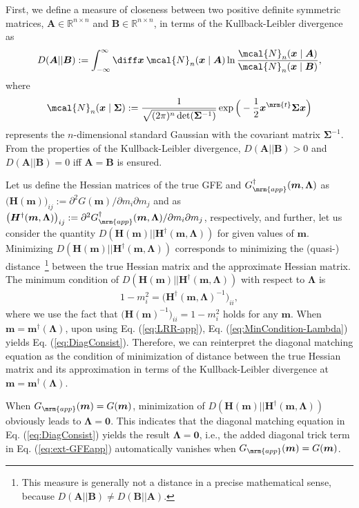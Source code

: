 \documentclass[%
 reprint,
 amsmath,amssymb,
 aps, 
 pre,
 showkeys
]{revtex4-1}
\begin{document}
First, we define a measure of closeness between two positive definite symmetric matrices, $\bm{A} \in \mathbb{R}^{n\times n}$ and $\bm{B} \in \mathbb{R}^{n\times n}$, 
in terms of the Kullback-Leibler divergence as
\begin{align}
D(\bm{A}||\bm{B}):=\int_{-\infty}^{\infty}\diff\bm{x}\> \mcal{N}_n(\bm{x} \mid \bm{A})\ln \frac{ \mcal{N}_n(\bm{x} \mid \bm{A})}{\mcal{N}_n(\bm{x} \mid \bm{B})},
\label{eq:KLD}
\end{align}
where 
\begin{align*}
\mcal{N}_n(\bm{x} \mid \bm{\Sigma}):=\frac{1}{\sqrt{(2\pi)^{n} \det(\bm{\Sigma}^{-1})}}\exp\Big(-\frac{1}{2}\bm{x}^{\mrm{t}}\bm{\Sigma}\bm{x}\Big)
\end{align*}
represents the $n$-dimensional standard Gaussian with the covariant matrix $\bm{\Sigma}^{-1}$. 
From the properties of the Kullback-Leibler divergence, $D(\bm{A}||\bm{B}) >0$ and $D(\bm{A}||\bm{B}) = 0$ iff $\bm{A}=\bm{B}$ is ensured.

Let us define the Hessian matrices of the true GFE and $G_{\mrm{app}}^{\dagger}(\bm{m}, \bm{\Lambda})$ as
$\big(\bm{H}(\bm{m}) \big)_{ij}:= \partial^2 G(\bm{m})/ \partial m_i\partial m_j$ 
and as $\big(\bm{H}^{\dagger}(\bm{m},\bm{\Lambda}) \big)_{ij}:= \partial^2 G_{\mrm{app}}^{\dagger}(\bm{m}, \bm{\Lambda})/\partial m_i\partial m_j$,
respectively, and further, let us consider the quantity $D(\bm{H}(\bm{m})||\bm{H}^{\dagger}(\bm{m},\bm{\Lambda}))$ for given values of $\bm{m}$. 
Minimizing $D(\bm{H}(\bm{m})||\bm{H}^{\dagger}(\bm{m},\bm{\Lambda}))$ corresponds to minimizing the (quasi-) distance~\footnote{
This measure is generally not a distance in a precise mathematical sense, because $D(\bm{A}||\bm{B}) \not= D(\bm{B}||\bm{A})$.
} between the true Hessian matrix and the approximate Hessian matrix. 
The minimum condition of $D(\bm{H}(\bm{m})||\bm{H}^{\dagger}(\bm{m},\bm{\Lambda}))$ with respect to $\bm{\Lambda}$ is 
\begin{align}
1 - m_i^2 = \big( \bm{H}^{\dagger}(\bm{m},\bm{\Lambda})^{-1} \big)_{ii},
\label{eq:MinCondition-Lambda}
\end{align}
where we use the fact that $\big( \bm{H}(\bm{m})^{-1} \big)_{ii} = 1 - m_i^2$ holds for any $\bm{m}$. 
When $\bm{m} = \bm{m}^{\dagger}(\bm{\Lambda})$, upon using Eq. (\ref{eq:LRR-app}), Eq. (\ref{eq:MinCondition-Lambda}) yields Eq. (\ref{eq:DiagConsist}). 
Therefore, we can reinterpret the diagonal matching equation as the condition of minimization of distance between the true Hessian matrix and its approximation in terms of the Kullback-Leibler divergence 
at $\bm{m} = \bm{m}^{\dagger}(\bm{\Lambda})$.

When $G_{\mrm{app}}(\bm{m}) = G(\bm{m})$, minimization of $D(\bm{H}(\bm{m})||\bm{H}^{\dagger}(\bm{m},\bm{\Lambda}))$ obviously leads to $\bm{\Lambda}=\bm{0}$. 
This indicates that the diagonal matching equation in Eq. (\ref{eq:DiagConsist}) yields the result $\bm{\Lambda}=\bm{0}$, i.e., the added diagonal trick term in Eq. (\ref{eq:ext-GFEapp}) 
automatically vanishes when $G_{\mrm{app}}(\bm{m}) = G(\bm{m})$. 



\end{document}

